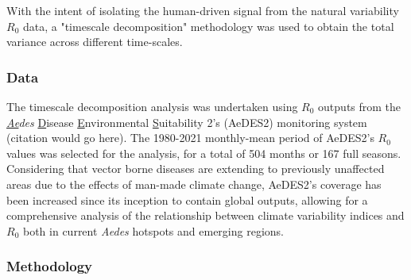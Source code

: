 \documentclass[fleqn,10pt]{wlscirep}
\begin{document}
  With the intent of isolating the human-driven signal from the natural variability $R_0$ data, a "timescale decomposition" methodology was used to obtain the total variance across different time-scales. 

  \subsubsection{Data} \label{sec-methods-1-data}
  The timescale decomposition analysis was undertaken using $R_0$ outputs from the \textit{\underline{Ae}des} \underline{D}isease \underline{E}nvironmental \underline{S}uitability 2's (AeDES2) monitoring system (citation would go here). The 1980-2021 monthly-mean period of AeDES2's $R_0$ values was selected for the analysis, for a total of 504 months or 167 full seasons. Considering that vector borne diseases are extending to previously unaffected areas due to the effects of man-made climate change, AeDES2's coverage has been increased since its inception to contain global outputs, allowing for a comprehensive analysis of the relationship between climate variability indices and $R_0$ both in current \textit{Aedes} hotspots and emerging regions.

  \subsubsection{Methodology} \label{sec-methods-1-methodology}
\end{document}
